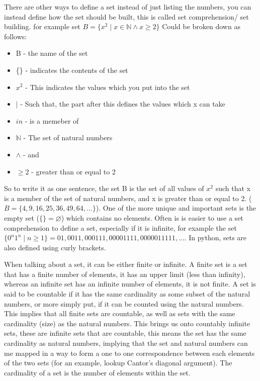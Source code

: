   There are other ways to define a set instead of just listing the numbers, you can instead define how the set should be built, this is called set comprehension/ set building. for example set $B=\{x^2 \mid x\in\mathbb{N} \wedge x \geq 2\}$
  Could be broken down as follows:
  \begin{itemize}
  	\item B - the name of the set
  	\item \{\} - indicates the contents of the set
  	\item $x^2$ - This indicates the values which you put into the set
  	\item $\mid$ - Such that, the part after this defines the values which x can take
  	\item $in$ - is a memeber of
	\item $\mathbb{N}$ - The set of natural numbers
	\item $\wedge$ - and 
	\item $\geq2$ - greater than or equal to 2
  \end{itemize}
  So to write it as one sentence, the set B is the set of all values of $x^2$ such that x is a member of the set of natural numbers, and x is greater than or equal to 2. ($B=\{4,9,16,25,36,49,64,\dots\}$). One of the more unique and important sets is the empty set ($\{\} = \varnothing$) which contains no elements. Often is is easier to use a set comprehension to define a set, especially if it is infinite, for example the set $\{0^n1^n \mid n \geq 1\} = {01,0011,000111,00001111,0000011111,\dots}$. In python, sets are also defined using curly brackets.
  
  When talking about a set, it can be either finite or infinite. A finite set is a set that has a finite number of elements, it has an upper limit (less than infinity), whereas an infinite set has an infinite number of elements, it is not finite. A set is said to be countable if it has the same cardinality as some subset of the natural numbers, or more simply put, if it can be counted using the natural numbers. This implies that all finite sets are countable, as well as sets with the same cardinality (size) as the natural numbers. This brings us onto countably infinite sets, these are infinite sets that are countable, this means the set has the same cardinality as natural numbers, implying that the set and natural numbers can me mapped in a way to form a one to one correspondence between each elements of the two sets (for an example, lookup Cantor's diagonal argument). The cardinality of a set is the number of elements within the set.
  

